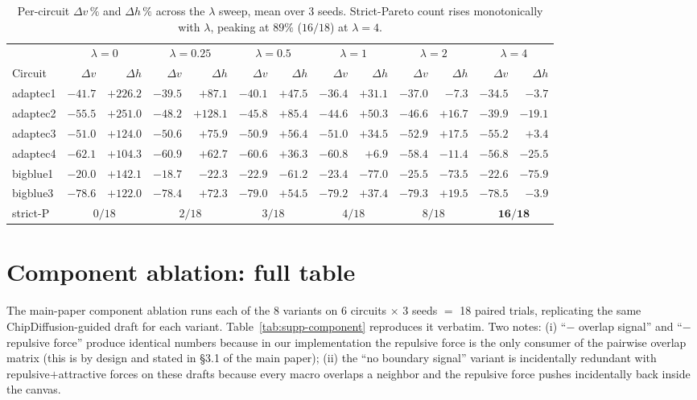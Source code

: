 \documentclass{article}
\begin{document}
\begin{table}[h]
\centering
\small
\begin{tabular}{lrr|rr|rr|rr|rr|rr}
\toprule
& \multicolumn{2}{c|}{$\lambda{=}0$} & \multicolumn{2}{c|}{$\lambda{=}0.25$} &
\multicolumn{2}{c|}{$\lambda{=}0.5$} & \multicolumn{2}{c|}{$\lambda{=}1$} &
\multicolumn{2}{c|}{$\lambda{=}2$} & \multicolumn{2}{c}{$\lambda{=}4$} \\
Circuit & $\Delta v$ & $\Delta h$ & $\Delta v$ & $\Delta h$ &
$\Delta v$ & $\Delta h$ & $\Delta v$ & $\Delta h$ &
$\Delta v$ & $\Delta h$ & $\Delta v$ & $\Delta h$ \\
\midrule
adaptec1 & $-41.7$ & $+226.2$ & $-39.5$ & $+87.1$ & $-40.1$ & $+47.5$ & $-36.4$ & $+31.1$ & $-37.0$ & $-7.3$ & $-34.5$ & $-3.7$ \\
adaptec2 & $-55.5$ & $+251.0$ & $-48.2$ & $+128.1$ & $-45.8$ & $+85.4$ & $-44.6$ & $+50.3$ & $-46.6$ & $+16.7$ & $-39.9$ & $-19.1$ \\
adaptec3 & $-51.0$ & $+124.0$ & $-50.6$ & $+75.9$ & $-50.9$ & $+56.4$ & $-51.0$ & $+34.5$ & $-52.9$ & $+17.5$ & $-55.2$ & $+3.4$ \\
adaptec4 & $-62.1$ & $+104.3$ & $-60.9$ & $+62.7$ & $-60.6$ & $+36.3$ & $-60.8$ & $+6.9$ & $-58.4$ & $-11.4$ & $-56.8$ & $-25.5$ \\
bigblue1 & $-20.0$ & $+142.1$ & $-18.7$ & $-22.3$ & $-22.9$ & $-61.2$ & $-23.4$ & $-77.0$ & $-25.5$ & $-73.5$ & $-22.6$ & $-75.9$ \\
bigblue3 & $-78.6$ & $+122.0$ & $-78.4$ & $+72.3$ & $-79.0$ & $+54.5$ & $-79.2$ & $+37.4$ & $-79.3$ & $+19.5$ & $-78.5$ & $-3.9$ \\
\midrule
strict-P & \multicolumn{2}{c|}{$0/18$} & \multicolumn{2}{c|}{$2/18$} &
\multicolumn{2}{c|}{$3/18$} & \multicolumn{2}{c|}{$4/18$} &
\multicolumn{2}{c|}{$8/18$} & \multicolumn{2}{c}{$\mathbf{16/18}$} \\
\bottomrule
\end{tabular}
\caption{Per-circuit $\Delta v\,\%$ and $\Delta h\,\%$ across the
$\lambda$ sweep, mean over 3 seeds.  Strict-Pareto count rises
monotonically with $\lambda$, peaking at $89\%$ ($16/18$) at
$\lambda{=}4$.}
\label{tab:supp-lambda}
\end{table}

\section{Component ablation: full table}
\label{sec:supp-component}

The main-paper component ablation runs each of the 8 variants on
6 circuits $\times$ 3 seeds $=$ 18 paired trials, replicating the same
ChipDiffusion-guided draft for each variant.  Table~\ref{tab:supp-component}
reproduces it verbatim.  Two notes: (i) ``$-$ overlap signal'' and
``$-$ repulsive force'' produce identical numbers because in our
implementation the repulsive force is the only consumer of the pairwise
overlap matrix (this is by design and stated in \S3.1 of the main paper);
(ii) the ``no boundary signal'' variant is incidentally redundant with
repulsive$+$attractive forces on these drafts because every macro overlaps a
neighbor and the repulsive force pushes incidentally back inside the canvas.
\end{document}
